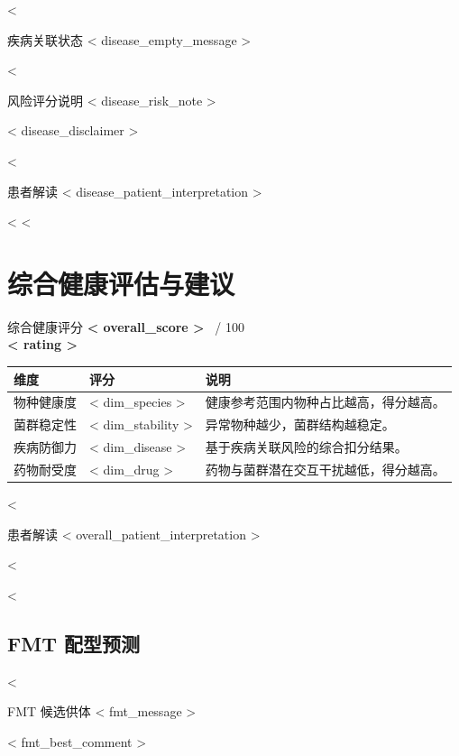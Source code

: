 <%
\begin{infobox}{疾病关联状态}
<{ disease_empty_message }>
\end{infobox}
<%

\begin{infobox}{风险评分说明}
<{ disease_risk_note }>

<{ disease_disclaimer }>
\end{infobox}
<%
\begin{infobox}{患者解读}
<{ disease_patient_interpretation }>
\end{infobox}
<%
<%

\section{综合健康评估与建议}
\begin{resultbox}{综合健康评分}
  {\sffamily\bfseries\fontsize{26pt}{30pt}\selectfont\color{WgsBlue} <{ overall_score }>} \, {\large\color{graytext}/ 100} \\[0.4em]
  {\bfseries\color{darkgray} <{ rating }>}
\end{resultbox}

{\footnotesize
\begin{tabularx}{\textwidth}{L{0.26\textwidth} C{0.14\textwidth} Y}
\toprule
{}
\textbf{维度} & \textbf{评分} & \textbf{说明} \\
\midrule
物种健康度 & <{ dim_species }> & 健康参考范围内物种占比越高，得分越高。 \\
菌群稳定性 & <{ dim_stability }> & 异常物种越少，菌群结构越稳定。 \\
疾病防御力 & <{ dim_disease }> & 基于疾病关联风险的综合扣分结果。 \\
药物耐受度 & <{ dim_drug }> & 药物与菌群潜在交互干扰越低，得分越高。 \\
\bottomrule
\end{tabularx}
}
<%
\begin{infobox}{患者解读}
<{ overall_patient_interpretation }>
\end{infobox}
<%

<%
\subsection{FMT 配型预测}
<%
\begin{recommendbox}{FMT 候选供体}
<{ fmt_message }>

<{ fmt_best_comment }>
\end{recommendbox}

